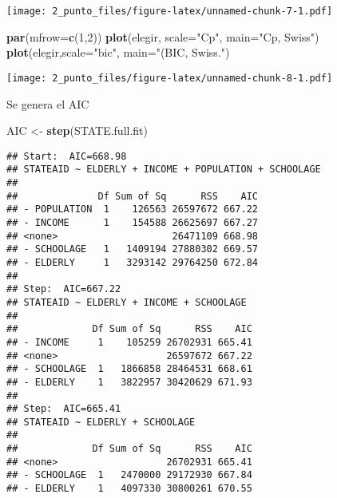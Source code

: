 \documentclass[
]{article}
\newenvironment{Shaded}{\begin{snugshade}}{\end{snugshade}}
\newcommand{\DataTypeTok}[1]{\textcolor[rgb]{0.13,0.29,0.53}{#1}}
\newcommand{\DecValTok}[1]{\textcolor[rgb]{0.00,0.00,0.81}{#1}}
\newcommand{\KeywordTok}[1]{\textcolor[rgb]{0.13,0.29,0.53}{\textbf{#1}}}
\newcommand{\NormalTok}[1]{#1}
\newcommand{\StringTok}[1]{\textcolor[rgb]{0.31,0.60,0.02}{#1}}
\begin{document}
\texttt{[image: 2\_punto\_files/figure-latex/unnamed-chunk-7-1.pdf]}

\begin{Shaded}
\begin{Highlighting}[]
\KeywordTok{par}\NormalTok{(}\DataTypeTok{mfrow=}\KeywordTok{c}\NormalTok{(}\DecValTok{1}\NormalTok{,}\DecValTok{2}\NormalTok{))}
\KeywordTok{plot}\NormalTok{(elegir, }\DataTypeTok{scale=}\StringTok{"Cp"}\NormalTok{, }\DataTypeTok{main=}\StringTok{"Cp, Swiss"}\NormalTok{)}
\KeywordTok{plot}\NormalTok{(elegir,}\DataTypeTok{scale=}\StringTok{"bic"}\NormalTok{, }\DataTypeTok{main=}\StringTok{"(BIC, Swiss."}\NormalTok{)}
\end{Highlighting}
\end{Shaded}

\texttt{[image: 2\_punto\_files/figure-latex/unnamed-chunk-8-1.pdf]}

Se genera el AIC

\begin{Shaded}
\begin{Highlighting}[]
\NormalTok{AIC <-}\StringTok{ }\KeywordTok{step}\NormalTok{(STATE.full.fit)}
\end{Highlighting}
\end{Shaded}

\begin{verbatim}
## Start:  AIC=668.98
## STATEAID ~ ELDERLY + INCOME + POPULATION + SCHOOLAGE
## 
##              Df Sum of Sq      RSS    AIC
## - POPULATION  1    126563 26597672 667.22
## - INCOME      1    154588 26625697 667.27
## <none>                    26471109 668.98
## - SCHOOLAGE   1   1409194 27880302 669.57
## - ELDERLY     1   3293142 29764250 672.84
## 
## Step:  AIC=667.22
## STATEAID ~ ELDERLY + INCOME + SCHOOLAGE
## 
##             Df Sum of Sq      RSS    AIC
## - INCOME     1    105259 26702931 665.41
## <none>                   26597672 667.22
## - SCHOOLAGE  1   1866858 28464531 668.61
## - ELDERLY    1   3822957 30420629 671.93
## 
## Step:  AIC=665.41
## STATEAID ~ ELDERLY + SCHOOLAGE
## 
##             Df Sum of Sq      RSS    AIC
## <none>                   26702931 665.41
## - SCHOOLAGE  1   2470000 29172930 667.84
## - ELDERLY    1   4097330 30800261 670.55
\end{verbatim}
\end{document}
